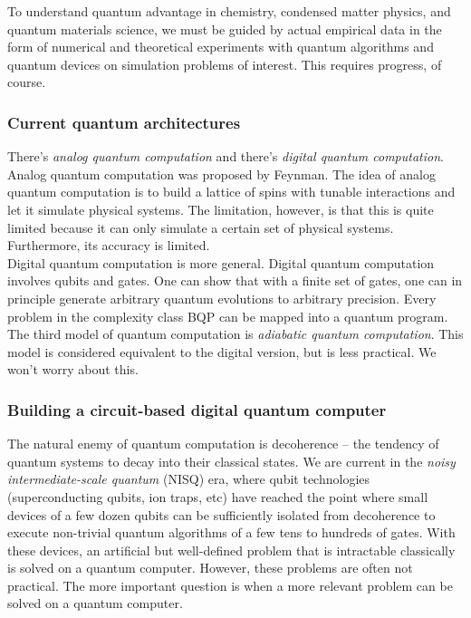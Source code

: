 \documentclass{book}
\theoremstyle{definition}
\begin{document}
To understand quantum advantage in chemistry, condensed matter physics, and quantum materials science, we must be guided by actual empirical data in the form of numerical and theoretical experiments with quantum algorithms and quantum devices on simulation problems of interest. This requires progress, of course. 



\subsubsection{Current quantum architectures}
There's \textit{analog quantum computation} and there's \textit{digital quantum computation}. Analog quantum computation was proposed by Feynman. The idea of analog quantum computation is to build a lattice of spins with tunable interactions and let it simulate physical systems. The limitation, however, is that this is quite limited because it can only simulate a certain set of physical systems. Furthermore, its accuracy is limited. \\

Digital quantum computation is more general. Digital quantum computation involves qubits and gates. One can show that with a finite set of gates, one can in principle generate arbitrary quantum evolutions to arbitrary precision. Every problem in the complexity class BQP can be mapped into a quantum program. \\


The third model of quantum computation is \textit{adiabatic quantum computation}. This model is considered equivalent to the digital version, but is less practical. We won't worry about this. 



\subsubsection{Building a circuit-based digital quantum computer}

The natural enemy of quantum computation is decoherence -- the tendency of quantum systems to decay into their classical states. We are current in the \textit{noisy intermediate-scale quantum} (NISQ) era, where qubit technologies (superconducting qubits, ion traps, etc) have reached the point where small devices of a few dozen qubits can be sufficiently isolated from decoherence to execute non-trivial quantum algorithms of a few tens to hundreds of gates. With these devices, an artificial but well-defined problem that is intractable classically is solved on a quantum computer. However, these problems are often not practical. The more important question is when a more relevant problem can be solved on a quantum computer. \\
\end{document}
